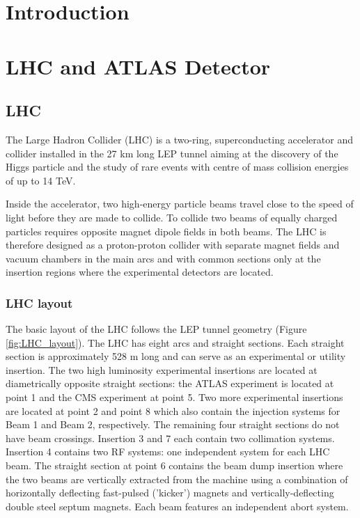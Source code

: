 \documentclass[a4paper, oneside, 11pt, openright]{book}
\begin{document}
	\clearpage\null\thispagestyle{empty}\newpage
	
	\tableofcontents
	
	\chapter*{Introduction}
	
		
	
	\chapter{LHC and ATLAS Detector}
		\section{LHC}
			The Large Hadron Collider (LHC) \cite{LHC_DESIGN_2004} is a two-ring, superconducting accelerator and collider installed in the 27 km long LEP \cite{LEP_DESIGN_2001} tunnel aiming at the discovery of the Higgs particle and the study of rare events with centre of mass collision energies of up to 14 TeV. 
			
			Inside the accelerator, two high-energy particle beams travel close to the speed of light before they are made to collide. To collide two beams of equally charged particles requires opposite magnet dipole fields in both beams. The LHC is therefore designed as a proton-proton collider with separate magnet fields and vacuum chambers in the main arcs and with common sections only at the insertion regions where the experimental detectors are located. 
		
			\subsection{LHC layout}
				The basic layout of the LHC \cite{LHC_DESIGN_2004} follows the LEP tunnel geometry (Figure \ref{fig:LHC_layout}). The LHC has eight arcs and straight sections. Each straight section is approximately 528 m long and can serve as an experimental or utility insertion. The two high luminosity experimental insertions are located at diametrically opposite straight sections: the ATLAS experiment is located at point 1 and the CMS experiment at point 5. Two more experimental insertions are located at point 2 and point 8 which also contain the injection systems for Beam 1 and Beam 2, respectively. The remaining four straight sections do not have beam crossings. Insertion 3 and 7 each contain two collimation systems. Insertion 4 contains two RF systems: one independent system for each LHC beam. The straight section at point 6 contains the beam dump insertion where the two beams are vertically extracted from the machine using a combination of horizontally deflecting fast-pulsed (’kicker’) magnets and vertically-deflecting double steel septum magnets. Each beam features an independent abort system.
				
\end{document}
